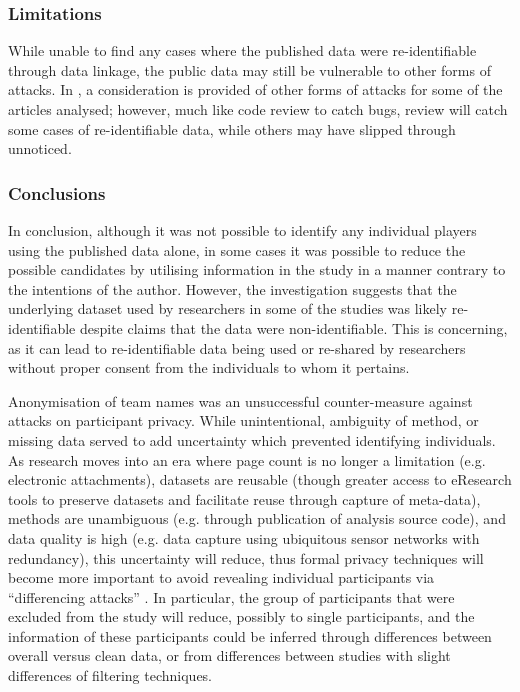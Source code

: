 \subsubsection{Limitations}

While unable to find any cases where the published data were re-identifiable through data linkage, the public data may still be vulnerable to other forms of attacks. In , a consideration is provided of other forms of attacks for some of the articles analysed; however, much like code review to catch bugs, review will catch some cases of re-identifiable data, while others may have slipped through unnoticed.

\subsubsection{Conclusions}


In conclusion, although it was not possible to identify any individual players using the published data alone, in some cases it was possible to reduce the possible candidates by utilising information in the study in a manner contrary to the intentions of the author. However, the investigation suggests that the underlying dataset used by researchers in some of the studies was likely re-identifiable despite claims that the data were non-identifiable. This is concerning, as it can lead to re-identifiable data being used or re-shared by researchers without proper consent from the individuals to whom it pertains.

Anonymisation of team names was an unsuccessful counter-measure against attacks on participant privacy. While unintentional, ambiguity of method, or missing data served to add uncertainty which prevented identifying individuals. As research moves into an era where page count is no longer a limitation (e.g. electronic attachments), datasets are reusable (though greater access to eResearch tools to preserve datasets and facilitate reuse through capture of meta-data), methods are unambiguous (e.g. through publication of analysis source code), and data quality is high (e.g. data capture using ubiquitous sensor networks with redundancy), this uncertainty will reduce, thus formal privacy techniques will become more important to avoid revealing individual participants via ``differencing attacks'' \cite{Keefe2017}. In particular, the group of participants that were excluded from the study will reduce, possibly to single participants, and the information of these participants could be inferred through differences between overall versus clean data, or from differences between studies with slight differences of filtering techniques.



